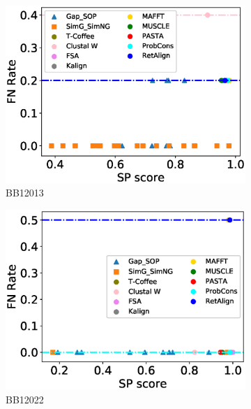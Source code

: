 \begin{figure}[!htbp]
\begin{adjustwidth}{-1.5cm}{-1cm}
\begin{subfigure}{0.22\textwidth}
			\includegraphics[width=\columnwidth]{Figure/summary/precomputedInit/Balibase/BB12013_fnrate_vs_sp_2}
			\caption{BB12013}
		\end{subfigure}
		\begin{subfigure}{0.22\textwidth}
			\includegraphics[width=\columnwidth]{Figure/summary/precomputedInit/Balibase/BB12022_fnrate_vs_sp_2}
			\caption{BB12022}
		\end{subfigure}
		\begin{subfigure}{0.22\textwidth}

\end{subfigure}
\end{adjustwidth}
\end{figure}
